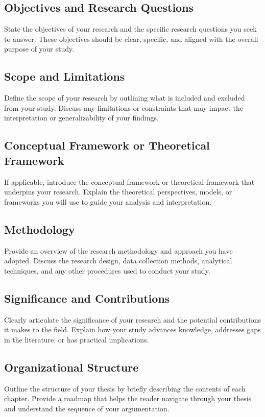 \subsection{Objectives and Research Questions}
State the objectives of your research and the specific research questions you seek to answer.
These objectives should be clear, specific, and aligned with the overall purpose of your study.

\subsection{Scope and Limitations}
Define the scope of your research by outlining what is included and excluded from your study.
Discuss any limitations or constraints that may impact the interpretation or generalizability of your findings.

\subsection{Conceptual Framework or Theoretical Framework}
If applicable, introduce the conceptual framework or theoretical framework that underpins your research.
Explain the theoretical perspectives, models, or frameworks you will use to guide your analysis and interpretation.

\subsection{Methodology}
Provide an overview of the research methodology and approach you have adopted.
Discuss the research design, data collection methods, analytical techniques, and any other procedures used to conduct your study.

\subsection{Significance and Contributions}
Clearly articulate the significance of your research and the potential contributions it makes to the field.
Explain how your study advances knowledge, addresses gaps in the literature, or has practical implications.

\subsection{Organizational Structure}
Outline the structure of your thesis by briefly describing the contents of each chapter.
Provide a roadmap that helps the reader navigate through your thesis and understand the sequence of your argumentation.

